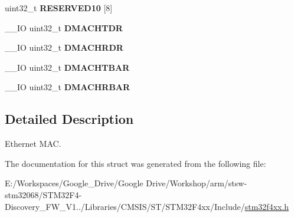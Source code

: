 \begin{DoxyCompactItemize}
\item 
\hypertarget{struct_e_t_h___type_def_a57d552323802fb4dd0bac95a02e814f0}{uint32\-\_\-t {\bfseries R\-E\-S\-E\-R\-V\-E\-D10} \mbox{[}8\mbox{]}}\label{struct_e_t_h___type_def_a57d552323802fb4dd0bac95a02e814f0}

\item 
\hypertarget{struct_e_t_h___type_def_ab5bb348210fdd9a5538eb57abc5a5673}{\-\_\-\-\_\-\-I\-O uint32\-\_\-t {\bfseries D\-M\-A\-C\-H\-T\-D\-R}}\label{struct_e_t_h___type_def_ab5bb348210fdd9a5538eb57abc5a5673}

\item 
\hypertarget{struct_e_t_h___type_def_a9c49de2e699886d6604fd2b3d376a0e9}{\-\_\-\-\_\-\-I\-O uint32\-\_\-t {\bfseries D\-M\-A\-C\-H\-R\-D\-R}}\label{struct_e_t_h___type_def_a9c49de2e699886d6604fd2b3d376a0e9}

\item 
\hypertarget{struct_e_t_h___type_def_a900f9f888342fbdd8ee07e3ee1d4b73c}{\-\_\-\-\_\-\-I\-O uint32\-\_\-t {\bfseries D\-M\-A\-C\-H\-T\-B\-A\-R}}\label{struct_e_t_h___type_def_a900f9f888342fbdd8ee07e3ee1d4b73c}

\item 
\hypertarget{struct_e_t_h___type_def_acf3f7ecbf774d8d505655ac7f24761fc}{\-\_\-\-\_\-\-I\-O uint32\-\_\-t {\bfseries D\-M\-A\-C\-H\-R\-B\-A\-R}}\label{struct_e_t_h___type_def_acf3f7ecbf774d8d505655ac7f24761fc}

\end{DoxyCompactItemize}


\subsection{Detailed Description}
Ethernet M\-A\-C. 

The documentation for this struct was generated from the following file\-:\begin{DoxyCompactItemize}
\item 
E\-:/\-Workspaces/\-Google\-\_\-\-Drive/\-Google Drive/\-Workshop/arm/stsw-\/stm32068/\-S\-T\-M32\-F4-\/\-Discovery\-\_\-\-F\-W\-\_\-\-V1../\-Libraries/\-C\-M\-S\-I\-S/\-S\-T/\-S\-T\-M32\-F4xx/\-Include/\hyperlink{stm32f4xx_8h}{stm32f4xx.\-h}\end{DoxyCompactItemize}

